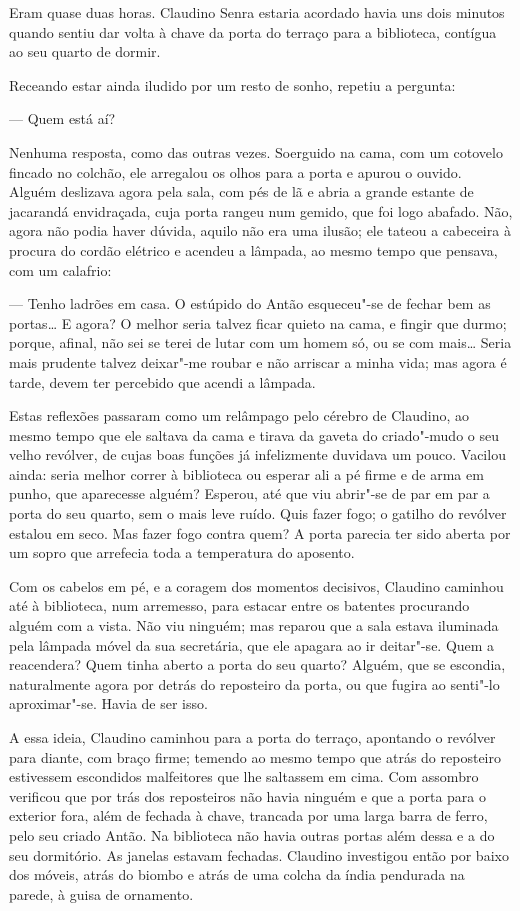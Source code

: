 Eram quase duas horas. Claudino Senra estaria acordado havia uns dois
minutos quando sentiu dar volta à chave da porta do terraço para a
biblioteca, contígua ao seu quarto de dormir.

Receando estar ainda iludido por um resto de sonho, repetiu a pergunta:

--- Quem está aí?

Nenhuma resposta, como das outras vezes. Soerguido na cama, com um
cotovelo fincado no colchão, ele arregalou os olhos para a porta e
apurou o ouvido. Alguém deslizava agora pela sala, com pés de lã e abria
a grande estante de jacarandá envidraçada,
cuja porta rangeu num gemido, que foi logo abafado. Não, agora não podia
haver dúvida,
aquilo não era uma ilusão; ele tateou a cabeceira à procura do cordão
elétrico e acendeu a lâmpada, ao mesmo tempo que pensava, com um
calafrio:

--- Tenho ladrões em casa. O estúpido do Antão esqueceu"-se de fechar bem
as portas\ldots{} E agora? O melhor seria talvez ficar quieto na cama, e
fingir que durmo; porque, afinal, não sei se terei de lutar com um homem
só, ou se com mais\ldots{} Seria mais prudente talvez deixar"-me roubar e não
arriscar a minha vida; mas agora é tarde, devem ter percebido que acendi
a lâmpada.

Estas reflexões passaram como um relâmpago pelo cérebro de Claudino, ao
mesmo tempo que ele saltava da cama e tirava da gaveta do criado"-mudo o
seu velho revólver, de cujas boas funções já infelizmente duvidava um
pouco. Vacilou ainda: seria
melhor correr à biblioteca ou esperar ali a pé firme e de arma em punho,
que aparecesse alguém? Esperou, até que viu abrir"-se de par em par a
porta do seu quarto, sem o mais leve ruído. Quis fazer fogo; o gatilho
do revólver estalou em seco. Mas fazer fogo contra quem? A porta parecia
ter sido aberta por um sopro que arrefecia toda a temperatura do
aposento.

Com os cabelos em pé, e a coragem dos momentos decisivos, Claudino
caminhou até à biblioteca, num arremesso, para estacar entre os batentes
procurando alguém com a vista. Não viu ninguém; mas reparou que a sala
estava iluminada pela lâmpada móvel da sua secretária, que ele apagara
ao ir deitar"-se. Quem a reacendera? Quem tinha aberto a porta do seu
quarto? Alguém, que se escondia, naturalmente agora por detrás do
reposteiro da porta, ou que fugira ao senti"-lo aproximar"-se. Havia de
ser isso.

A essa ideia, Claudino caminhou para a porta do terraço, apontando o
revólver para diante, com braço firme; temendo ao mesmo tempo que atrás
do reposteiro estivessem escondidos malfeitores que lhe saltassem em
cima. Com assombro verificou que por trás dos reposteiros não havia
ninguém e que a porta para o exterior fora, além de fechada à chave,
trancada por uma larga barra de ferro, pelo seu criado Antão. Na
biblioteca não havia outras portas além dessa e a do seu dormitório. As
janelas estavam fechadas. Claudino investigou então por baixo dos
móveis, atrás do biombo e atrás de uma colcha da índia pendurada na
parede, à guisa de ornamento.

